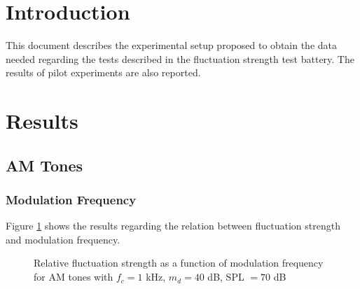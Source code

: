 \documentclass[a4paper]{article}
\begin{document}

\section{Introduction}

This document describes the experimental setup proposed to obtain the data
needed regarding the tests described in the fluctuation strength test battery.
The results of pilot experiments are also reported.

\section{Results}

\subsection{AM Tones}

\subsubsection{Modulation Frequency}

Figure \ref{fig:expres} shows the results regarding the relation between
fluctuation strength and modulation frequency.

\begin{figure}[ht]
    \centering
    \resizebox{!}{10cm}{
        
    }
    \caption{Relative fluctuation strength as a function of modulation
        frequency for AM tones with $f_c = 1$ kHz, $m_d = 40$ dB, SPL $= 70$ dB}
    \label{fig:expres}
\end{figure}
\end{document}
